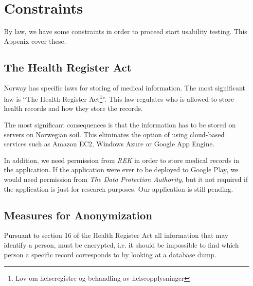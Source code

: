 
\chapter{Constraints}
\label{chp:securityrequirements}

By law, we have some constraints in order to proceed start usability testing. This Appenix cover these. 

\section{The Health Register Act}
\label{sec:helseregisterloven}

Norway has specific laws for storing of medical information. The most significant law is ``The Health Register Act\footnote{Lov om helseregistre og behandling av helseopplysninger}''\cite{helseregisterloven}. This law regulates who is allowed to store health records and how they store the records. 

The most significant consequences is that the information has to be stored on servers on Norwegian soil. This eliminates the option of using cloud-based services such as Amazon EC2, Windows Azure or Google App Engine. 

In addition, we need permission from \emph{REK}  in order to store medical records in the application. If the application were ever to be deployed to Google Play, we would need permission from \emph{The Data Protection Authority}, but it not required if the application is just for research purposes. Our application is still pending.

\section{Measures for Anonymization}
Pursuant to section 16 of the Health Register Act \cite{helseregisterloven} all information that may identify a person, must be encrypted, i.e. it should be impossible to find which person a specific record corresponds to by looking at a database dump.  